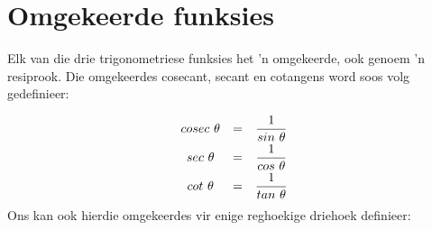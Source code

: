 % 
% 
% 
% 
% 
% 
% 
% 

\section{Omgekeerde funksies}
Elk van die drie trigonometriese funksies het 'n omgekeerde, ook genoem 'n resiprook. Die omgekeerdes cosecant, secant en cotangens word soos volg gedefinieer:

\begin{equation*}
\begin{array}{ccc}cosec~\theta & =& \dfrac{1}{sin~\theta } \vspace{3pt}\\
 sec~\theta & =& \dfrac{1}{cos~\theta } \vspace{3pt}\\
 cot~\theta & =& \dfrac{1}{tan~\theta }
\end{array}
\end{equation*}
Ons kan ook hierdie omgekeerdes vir enige reghoekige driehoek definieer:

